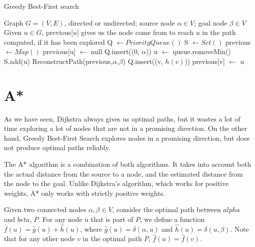 \documentclass[12pt]{report}
\newtheorem{definition}[theorem]{Definition}
\begin{document}
\begin{algorithm}
\caption{Greedy Best-First search}
\label{alg:greedy}
\begin{algorithmic}[1]
\Require Graph $G = (V, E)$, directed or undirected; source node $\alpha \in V$; goal node $\beta \in V$
\Ensure Given $u \in G$, previous[$u$] gives us the node come from to reach $u$ in the path computed, if it has been explored
\State Q $\gets PriorityQueue()$
\State S $\gets Set()$
\State previous $\gets Map()$
	\State previous[u] $\gets$ null
\EndFor
\State Q.insert((0, $\alpha$))
	\State u $\gets$ queue.removeMin()
	\State S.add(u)
	 
		\State \Return ReconstructPath(previous,$\alpha$,$\beta$)
	\EndIf
			\Continue
		\EndIf
		\State Q.insert((v, $h(v)$))
		\State previous[v] $\gets$ u
	\EndFor
\EndWhile
\EndProcedure
\end{algorithmic}
\end{algorithm}



\section{A*}
As we have seen, Dijkstra always gives us optimal paths, but it wastes a lot of time exploring a lot of nodes that are not in a promising direction. On the other hand, Greedy Best-First Search explores nodes in a promising direction, but does not produce optimal paths reliably.

The A* algorithm is a combination of both algorithms. It takes into account both the actual distance from the source to a node, and the estimated distance from the node to the goal. Unlike Dijkstra's algorithm, which works for positive weights, A* only works with strictly positive weights.

Given two connected nodes $\alpha, \beta \in V$, consider the optimal path between $alpha$ and $beta$, $P$. For any node $u$ that is part of $P$, we define a function $\hat{f}(u) = \hat{g}(u) + \hat{h}(u)$, where $\hat{g}(u) = \delta(\alpha, u)$ and $\hat{h}(u) = \delta(u, \beta)$. Note that for any other node $v$ in the optimal path $P$, $\hat{f}(u) = \hat{f}(v)$.
\end{document}
